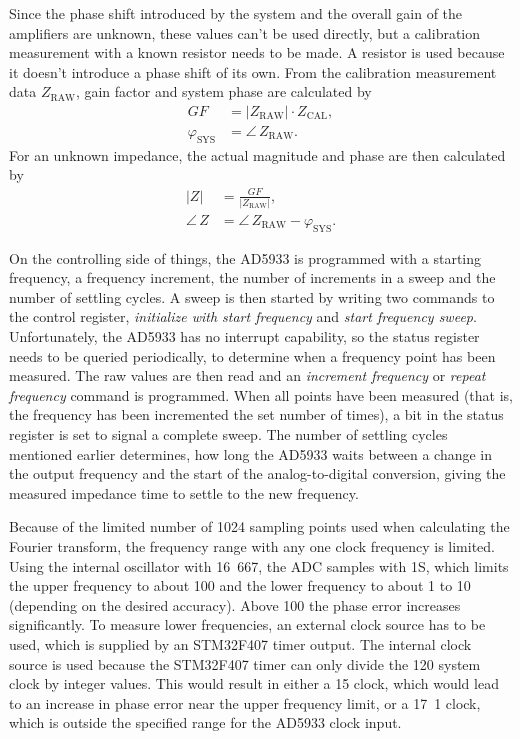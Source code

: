Since the phase shift introduced by the system and the overall gain of the amplifiers are unknown, these values can't
be used directly, but a calibration measurement with a known resistor needs to be made. A resistor is used because
it doesn't introduce a phase shift of its own.
From the calibration measurement data $ Z_\text{RAW} $, gain factor and system phase are calculated by
\begin{align}
  GF &= \left| Z_\text{RAW} \right| \cdot Z_\text{CAL} , \\
  \varphi_\text{SYS} &= \angle\, Z_\text{RAW}.
\end{align}
For an unknown impedance, the actual magnitude and phase are then calculated by
\begin{align}
  \left| Z \right| &= \frac{GF}{\left| Z_\text{RAW} \right|} , \\
  \angle\, Z &= \angle\, Z_\text{RAW} - \varphi_\text{SYS}.
\end{align}

On the controlling side of things, the AD5933 is programmed with a starting frequency, a frequency increment, the
number of increments in a sweep and the number of settling cycles.
A sweep is then started by writing two commands to the control register, \emph{initialize with start frequency} and
\emph{start frequency sweep}. Unfortunately, the AD5933 has no interrupt capability, so the status register needs to
be queried periodically, to determine when a frequency point has been measured. The raw values are then read and an
\emph{increment frequency} or \emph{repeat frequency} command is programmed. When all points have been measured
(that is, the frequency has been incremented the set number of times), a bit in the status register is set to signal a
complete sweep.
The number of settling cycles mentioned earlier determines, how long the AD5933 waits between a change
in the output frequency and the start of the analog-to-digital conversion, giving the measured impedance time to
settle to the new frequency.

Because of the limited number of 1024 sampling points used when calculating the Fourier transform,
the frequency range with any one clock frequency is limited. Using the internal oscillator with
\unit{16.667}{\mega\hertz}, the ADC samples with \unit{1}{\mega{}S\per\second}, which limits the upper frequency to
about \unit{100}{\kilo\hertz} and the lower frequency to about \unit{1}{\kilo\hertz} to \unit{10}{\kilo\hertz}
(depending on the desired accuracy). Above \unit{100}{\kilo\hertz} the phase error increases significantly.
To measure lower frequencies, an external clock source has to be used, which is supplied by an STM32F407 timer output.
The internal clock source is used because the STM32F407 timer can only divide the \unit{120}{\mega\hertz} system clock
by integer values. This would result in either a \unit{15}{\mega\hertz} clock, which would lead to an increase in phase
error near the upper frequency limit, or a \unit{17.1}{\mega\hertz} clock, which is outside the specified range for
the AD5933 clock input.


